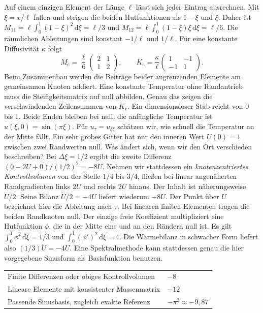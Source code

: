 Auf einem einzigen Element der Länge \(\ell\) lässt sich jeder Eintrag ausrechnen. Mit \(\xi=x/\ell\) fallen und steigen die beiden Hutfunktionen als \(1-\xi\) und \(\xi\). Daher ist \(M_{11}=\ell\int_0^1(1-\xi)^2\,\mathrm d\xi=\ell/3\) und \(M_{12}=\ell\int_0^1(1-\xi)\xi\,\mathrm d\xi=\ell/6\). Die räumlichen Ableitungen sind konstant \(-1/\ell\) und \(1/\ell\). Für eine konstante Diffusivität \(\kappa\) folgt
\[
 M_e=\frac{\ell}{6}\begin{pmatrix}2&1\\1&2\end{pmatrix},\qquad
 K_e=\frac{\kappa}{\ell}\begin{pmatrix}1&-1\\-1&1\end{pmatrix}.
\]
Beim Zusammenbau werden die Beiträge beider angrenzenden Elemente am gemeinsamen Knoten addiert. Eine konstante Temperatur ohne Randantrieb muss die Steifigkeitsmatrix auf null abbilden. Genau das zeigen die verschwindenden Zeilensummen von \(K_e\).
Ein dimensionsloser Stab reicht von 0 bis 1. Beide Enden bleiben bei null, die anfängliche Temperatur ist \(u(\xi,0)=\sin(\pi\xi)\). Für \(u_\tau=u_{\xi\xi}\) schätzen wir, wie schnell die Temperatur an der Mitte fällt. Ein sehr grobes Gitter hat nur den inneren Wert \(U(0)=1\) zwischen zwei Randwerten null. Was ändert sich, wenn wir den Ort verschieden beschreiben?
Bei \(\Delta\xi=1/2\) ergibt die zweite Differenz \((0-2U+0)/(1/2)^2=-8U\). Nehmen wir stattdessen ein \emph{knotenzentriertes Kontrollvolumen} von der Stelle \(1/4\) bis \(3/4\), fließen bei linear angenäherten Randgradienten links \(2U\) und rechts \(2U\) hinaus. Der Inhalt ist näherungsweise \(U/2\). Seine Bilanz \(\dot U/2=-4U\) liefert wiederum \(-8U\). Der Punkt über \(U\) bezeichnet hier die Ableitung nach \(\tau\).
Bei linearen finiten Elementen tragen die beiden Randknoten null. Der einzige freie Koeffizient multipliziert eine Hutfunktion \(\phi\), die in der Mitte eins und an den Rändern null ist. Es gilt \(\int_0^1\phi^2\,\mathrm d\xi=1/3\) und \(\int_0^1(\phi')^2\,\mathrm d\xi=4\). Die Wärmebilanz in schwacher Form liefert also \((1/3)\dot U=-4U\). Eine Spektralmethode kann stattdessen genau die hier vorgegebene Sinusform als Basisfunktion benutzen.
{\tblstart\begin{tabularx}{\linewidth}{@{}Yl@{}}\toprule
{}&\\\midrule
Finite Differenzen oder obiges Kontrollvolumen&\(-8\)\\
Lineare Elemente mit konsistenter Massenmatrix&\(-12\)\\
Passende Sinusbasis, zugleich exakte Referenz&\(-\pi^2\approx-9{,}87\)\\\bottomrule\end{tabularx}\par}
